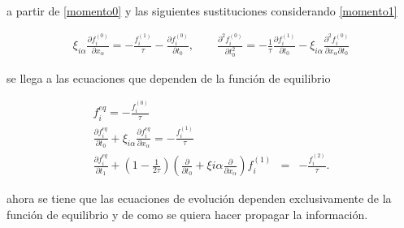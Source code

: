 \noindent a partir de \eqref{momento0} y las siguientes sustituciones considerando \eqref{momento1}

\begin{eqnarray}
\xi_{i\alpha}\frac{\partial f_{i}^{(0)}}{\partial x_{\alpha}} = -\frac{f_{i}^{(1)}}{\tau}-\frac{\partial f_{i}^{(0)}}{\partial t_{0}}, \qquad \frac{\partial^{2} f_{i}^{(0)}}{\partial t_{0}^{2}}=-\frac{1}{\tau}\frac{\partial f_{i}^{(1)}}{\partial t_{0}}-\xi_{i\alpha}\frac{\partial^{2}f_{i}^{(0)}}{\partial x_{\alpha}\partial t_{0}}
\end{eqnarray}

\noindent se llega a las ecuaciones que dependen de la función de equilibrio 

\begin{eqnarray}
f_{i}^{eq}=-\frac{f_{i}^{(0)}}{\tau}\\
\frac{\partial f_{i}^{eq}}{\partial t_{0}} + \xi_{i\alpha}\frac{\partial f_{i}^{eq}}{\partial x_{\alpha}} = -\frac{f_{i}^{(1)}}{\tau} \\
\frac{\partial f_{i}^{eq}}{\partial t_{1}}+\left(1-\frac{1}{2\tau}\right)\left(\frac{\partial}{\partial t_{0}}+\xi{i\alpha}\frac{\partial}{\partial x_{\alpha}}\right)f_{i}^{(1)} &=& -\frac{f_{i}^{(2)}}{\tau}.
\end{eqnarray}

\noindent ahora se tiene que las ecuaciones de evolución dependen exclusivamente de la función de equilibrio y de como se quiera hacer propagar la información. 

